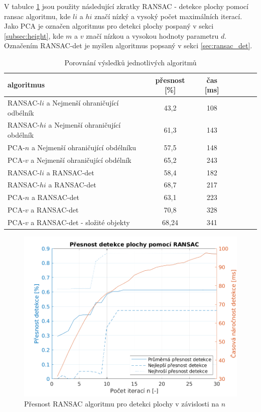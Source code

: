 \documentclass[twoside]{ctuthesis}
\begin{document}
V tabulce \ref{tab:vysledky} jsou použity následující zkratky RANSAC - detekce plochy pomocí ransac algoritmu, kde $li$ a $hi$ značí nízký a vysoký počet maximálních iterací. Jako PCA je označen algoritmus pro detekci plochy pospaný v sekci \ref{subsec:height}, kde $m$ a $v$ značí nízkou a vysokou hodnoty parametru $d$. Označením RANSAC-det je myšlen algoritmus popsaný v sekci \ref{sec:ransac_det}.
\begin{table}[h]
    \centering
    \begin{tabular}{|l|c|c|c|c|c|c|} \hline
        algoritmus &  přesnost [\%]& čas [ms]\\ \hline
        RANSAC-$li$ a Nejmenší ohraničující odbélník & 43,2 & 108 \\ \hline
        RANSAC-$hi$ a Nejmenší ohraničující obdélník & 61,3 & 143 \\ \hline
        PCA-$n$ a Nejmenší ohraničující obdélníku & 57,5 & 148 \\ \hline 
        PCA-$v$ a Nejmenší ohraničující obdélník & 65,2 & 243 \\ \hline
        RANSAC-$li$ a RANSAC-det & 58,4 & 182 \\ \hline
        RANSAC-$hi$ a RANSAC-det & 68,7 & 217 \\ \hline
        PCA-$n$ a RANSAC-det & 63,1 & 223 \\ \hline 
        PCA-$v$ a RANSAC-det & 70,8 & 328 \\ \hline
        PCA-$v$ a RANSAC-det - složité objekty & 68,24 & 341 \\ \hline
    \end{tabular}
    \caption{Porovnání výsledků jednotlivých algoritmů}
    \label{tab:vysledky}
\end{table}
\begin{figure}
    \centering
    \includegraphics[width =0.8\linewidth]{pictures/plane_ransac_iter.png}
    \caption{Přesnost RANSAC algoritmu pro detekci plochy v závislosti na $n$}
    \label{fig:ransac_max_iter}
\end{figure}
\end{document}

